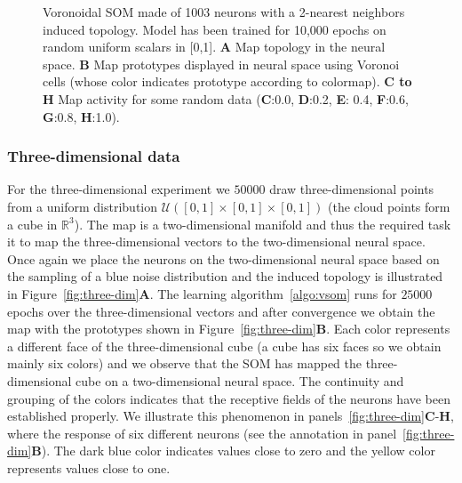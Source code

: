 \begin{figure}
  \caption{Voronoidal SOM made of 1003 neurons with a 2-nearest neighbors
    induced topology. Model has been trained for 10,000 epochs on random
    uniform scalars in [0,1]. \textbf{A} Map topology in the neural
    space. \textbf{B} Map prototypes displayed in neural space using Voronoi
    cells (whose color indicates prototype according to colormap). \textbf{C to
      H} Map activity for some random data (\textbf{C}:0.0, \textbf{D}:0.2,
    \textbf{E}: 0.4, \textbf{F}:0.6, \textbf{G}:0.8, \textbf{H}:1.0).}
    \label{fig:mucha}
\end{figure}


\subsubsection{Three-dimensional data}

For the three-dimensional experiment we $50000$ draw three-dimensional points
from a uniform distribution $\mathcal{U}([0, 1]\times [0, 1]\times [0, 1])$
(the cloud points form a cube in $\mathbb{R}^3$). The map is a two-dimensional
manifold and thus the required task it to map the three-dimensional vectors 
to the two-dimensional neural space. Once again we place the neurons on the
two-dimensional neural space based on the sampling of a blue noise distribution
and the induced topology is illustrated in Figure~\ref{fig:three-dim}{\bfseries \sffamily A}.
The learning algorithm~\ref{algo:vsom} runs for 
$25000$ epochs over the three-dimensional vectors and after convergence we 
obtain the map with the prototypes shown in Figure~\ref{fig:three-dim}{\bfseries \sffamily B}.
Each color represents a different face of the three-dimensional cube (a cube
has six faces so we obtain mainly six colors) and we observe that the SOM
has mapped the three-dimensional cube on a two-dimensional neural space. The 
continuity and grouping of the colors indicates that the receptive fields of 
the neurons have been established properly. We illustrate this phenomenon in 
panels~\ref{fig:three-dim}{\bfseries \sffamily C}-{\bfseries \sffamily H}, 
where the response of six different neurons (see the annotation in
panel~\ref{fig:three-dim}{\bfseries \sffamily B}). The dark blue color
indicates values close to zero and the yellow color represents values close to
one.

